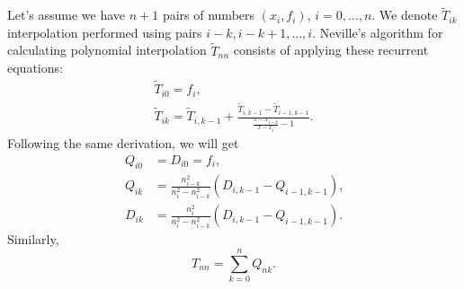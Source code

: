 \documentclass[11pt, twoside, twocolumn, paper = letter]{scrartcl}
\begin{document}
Let's assume we have $n + 1$ pairs of numbers $(x_i, f_i)$, $i = 0, \ldots, n$. We denote
$\tilde{T}_{ik}$ interpolation performed using pairs $i - k, i - k + 1, \ldots, i$. Neville's
algorithm for calculating polynomial interpolation $\tilde{T}_{nn}$ consists of applying these
recurrent equations:
\begin{equation*}
    \begin{gathered}
        \tilde{T}_{i0} = f_i
        \text{,}\\
        \tilde{T}_{ik}
          = \tilde{T}_{i, k-1}
          + \frac{\tilde{T}_{i, k - 1} - \tilde{T}_{i - 1, k - 1}}
                 {
                     \frac{x - x_{i - k}}{x - x_i} - 1
                 }
        \text{.}
    \end{gathered}
\end{equation*}
Following the same derivation, we will get
\begin{equation*}
    \begin{aligned}
        Q_{i0} &= D_{i0} = f_i
        \text{,}\\
        Q_{ik}
         &= \frac{n_{i - k}^2}{n_i^2 - n_{i - k}^2}\left(D_{i, k - 1} - Q_{i - 1, k - 1}\right)
        \text{,}\\
        D_{ik}
         &= \frac{n_{i}^2}{n_i^2 - n_{i - k}^2}\left(D_{i, k - 1} - Q_{i - 1, k - 1}\right)
        \text{.}
    \end{aligned}
\end{equation*}
Similarly,
\begin{equation*}
    T_{nn} = \sum_{k = 0}^n{Q_{nk}}
    \text{.}
\end{equation*}

\printbibliography
\end{document}
